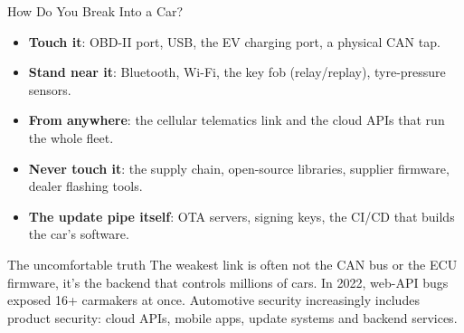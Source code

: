 
\begin{frame}{How Do You Break Into a Car?}
  \begin{itemize}
    \item \textbf{Touch it}: OBD-II port, USB, the EV charging port, a physical CAN tap.
    \item \textbf{Stand near it}: Bluetooth, Wi-Fi, the key fob (relay/replay), tyre-pressure sensors.
    \item \textbf{From anywhere}: the cellular telematics link and the cloud APIs that run the whole fleet.
    \item \textbf{Never touch it}: the supply chain, open-source libraries, supplier firmware, dealer flashing tools.
    \item \textbf{The update pipe itself}: OTA servers, signing keys, the CI/CD that builds the car's software.
  \end{itemize}
  \begin{alertblock}{The uncomfortable truth}
    The weakest link is often not the CAN bus or the ECU firmware, it's the backend that controls millions of cars. In 2022, web-API bugs exposed 16+ carmakers at once. Automotive security increasingly includes product security: cloud APIs, mobile apps, update systems and backend services.
  \end{alertblock}
\end{frame}
